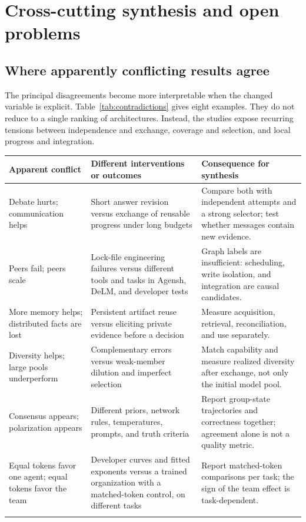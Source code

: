 \section{Cross-cutting synthesis and open problems}
\label{sec:synthesis}
\subsection{Where apparently conflicting results agree}
The principal disagreements become more interpretable when the changed variable is explicit. Table~\ref{tab:contradictions} gives eight examples. They do not reduce to a single ranking of architectures. Instead, the studies expose recurring tensions between independence and exchange, coverage and selection, and local progress and integration.

\begin{table}[t]
\centering\small
\begin{tabularx}{\textwidth}{@{}p{}YY@{}}
\toprule
Apparent conflict & Different interventions or outcomes & Consequence for synthesis\\
\midrule
Debate hurts; communication helps & Short answer revision versus exchange of reusable progress under long budgets & Compare both with independent attempts and a strong selector; test whether messages contain new evidence.\\\addlinespace[3pt]
Peers fail; peers scale & Lock-file engineering failures versus different tools and tasks in Agensh, DeLM, and developer tests & Graph labels are insufficient: scheduling, write isolation, and integration are causal candidates.\\\addlinespace[3pt]
More memory helps; distributed facts are lost & Persistent artifact reuse versus eliciting private evidence before a decision & Measure acquisition, retrieval, reconciliation, and use separately.\\\addlinespace[3pt]
Diversity helps; large pools underperform & Complementary errors versus weak-member dilution and imperfect selection & Match capability and measure realized diversity after exchange, not only the initial model pool.\\\addlinespace[3pt]
Consensus appears; polarization appears & Different priors, network rules, temperatures, prompts, and truth criteria & Report group-state trajectories and correctness together; agreement alone is not a quality metric.\\\addlinespace[3pt]
Equal tokens favor one agent; equal tokens favor the team & Developer curves and fitted exponents versus a trained organization with a matched-token control, on different tasks & Report matched-token comparisons per task; the sign of the team effect is task-dependent.\\\addlinespace[3pt]

\end{tabularx}
\end{table}
